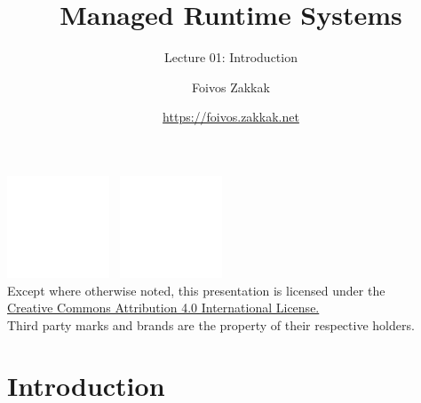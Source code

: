 \documentclass[
14pt,
aspectratio=169,
usenames,
dvipsnames,
x11names]{beamer}
\title{Managed Runtime Systems}
\subtitle{Lecture 01: Introduction}
\author[\url{https://foivos.zakkak.net}]{Foivos Zakkak}
\date{\url{https://foivos.zakkak.net}}
\begin{document}


\begin{frame}[plain]
  \titlepage
  \centering
  \includegraphics[height=.75cm]{cc}~
  \includegraphics[height=.75cm]{by}\\[1em]
  \scriptsize{Except where otherwise noted, this presentation is licensed under the\\
    \href{http://creativecommons.org/licenses/by/4.0/}%
    {Creative Commons Attribution 4.0 International License.}\\[1ex]
    Third party marks and brands are the property of their respective
    holders.}
\end{frame}


\section{Introduction}
\end{document}
